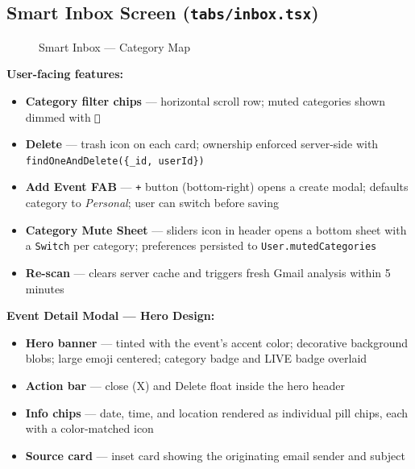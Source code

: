 \documentclass[12pt,a4paper]{report}
\begin{document}
\subsection{Smart Inbox Screen (\texttt{tabs/inbox.tsx})}

\begin{figure}[H]
\centering
{}
\caption{Smart Inbox — Category Map}
\end{figure}

\textbf{User-facing features:}
\begin{itemize}[leftmargin=*]
  \item \textbf{Category filter chips} — horizontal scroll row; muted categories shown dimmed with \texttt{🔕}
  \item \textbf{Delete} — trash icon on each card; ownership enforced server-side with \texttt{findOneAndDelete(\{\_id, userId\})}
  \item \textbf{Add Event FAB} — \texttt{+} button (bottom-right) opens a create modal; defaults category to \textit{Personal}; user can switch before saving
  \item \textbf{Category Mute Sheet} — sliders icon in header opens a bottom sheet with a \texttt{Switch} per category; preferences persisted to \texttt{User.mutedCategories}
  \item \textbf{Re-scan} — clears server cache and triggers fresh Gmail analysis within 5 minutes
\end{itemize}

\textbf{Event Detail Modal — Hero Design:}
\begin{itemize}[leftmargin=*]
  \item \textbf{Hero banner} — tinted with the event's accent color; decorative background blobs; large emoji centered; category badge and LIVE badge overlaid
  \item \textbf{Action bar} — close (X) and Delete float inside the hero header
  \item \textbf{Info chips} — date, time, and location rendered as individual pill chips, each with a color-matched icon
  \item \textbf{Source card} — inset card showing the originating email sender and subject
\end{itemize}
\end{document}
